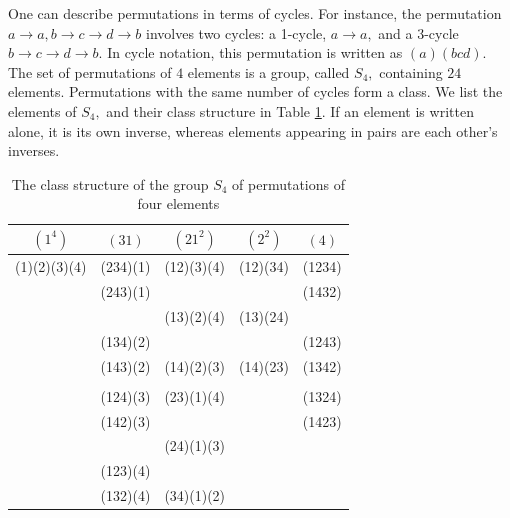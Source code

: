 \documentclass[pra,nofootinbib,showpacs,12pt]{revtex4}
\begin{document}
One can describe permutations in terms of cycles. For instance, the
permutation $a\rightarrow a,b\rightarrow c\rightarrow d\rightarrow b$
involves two cycles: a 1-cycle, $a\rightarrow a,$ and a 3-cycle $%
b\rightarrow c\rightarrow d\rightarrow b.$ In cycle notation, this
permutation is written as $(a)(bcd).$ The set of permutations of $4$
elements is a group, called $S_{4},$ containing $24$ elements. Permutations
with the same number of cycles form a class. We list the elements of $S_{4},$
and their class structure in Table \ref{S_4}. If an element is written
alone, it is its own inverse, whereas elements appearing in pairs are each
other's inverses.
\begin{table}[h]
\par
\begin{tabular}{ccccc}
$(1^{4})$ & $(31)$ & $(21^{2})$ & $(2^{2})$ & $(4)$ \\ \hline
(1)(2)(3)(4) & (234)(1) & (12)(3)(4) & (12)(34) & (1234) \\
& (243)(1) &  &  & (1432) \\
&  & (13)(2)(4) & (13)(24) &  \\
& (134)(2) &  &  & (1243) \\
& (143)(2) & (14)(2)(3) & (14)(23) & (1342) \\
&  &  &  &  \\
& (124)(3) & (23)(1)(4) &  & (1324) \\
& (142)(3) &  &  & (1423) \\
&  & (24)(1)(3) &  &  \\
& (123)(4) &  &  &  \\
& (132)(4) & (34)(1)(2) &  &
\end{tabular}%
\caption{The class structure of the group $S_{4}$ of permutations of four
elements}
\label{S_4}
\end{table}
\end{document}
